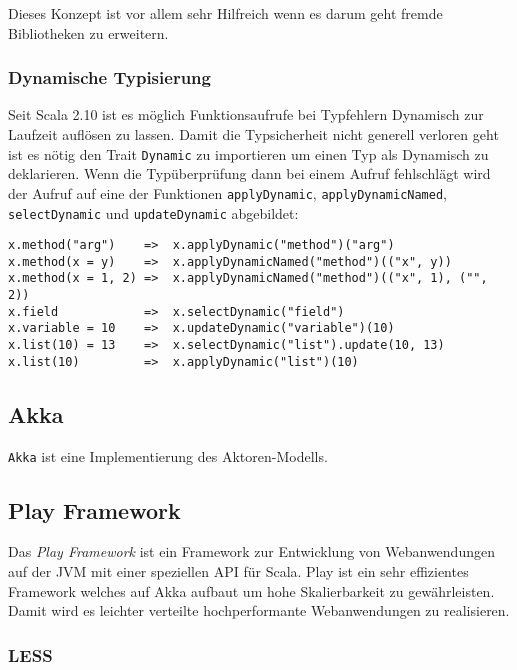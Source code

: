 Dieses Konzept ist vor allem sehr Hilfreich wenn es darum geht fremde 
Bibliotheken zu erweitern.

\subsubsection{Dynamische Typisierung}

Seit Scala 2.10 ist es möglich Funktionsaufrufe bei Typfehlern Dynamisch zur 
Laufzeit auflösen zu lassen. Damit die Typsicherheit nicht generell verloren 
geht ist es nötig den Trait \texttt{Dynamic} zu importieren um einen Typ als 
Dynamisch zu deklarieren. Wenn die Typüberprüfung dann bei einem Aufruf 
fehlschlägt wird der Aufruf auf eine der Funktionen \texttt{applyDynamic}, 
\texttt{applyDynamicNamed}, \texttt{selectDynamic} und \texttt{updateDynamic} 
abgebildet:

\begin{lstlisting}
x.method("arg")    =>  x.applyDynamic("method")("arg")
x.method(x = y)    =>  x.applyDynamicNamed("method")(("x", y))
x.method(x = 1, 2) =>  x.applyDynamicNamed("method")(("x", 1), ("", 2))
x.field            =>  x.selectDynamic("field")
x.variable = 10    =>  x.updateDynamic("variable")(10)
x.list(10) = 13    =>  x.selectDynamic("list").update(10, 13)
x.list(10)         =>  x.applyDynamic("list")(10)
\end{lstlisting}
 
\subsection{Akka}

\cite{actors}

\texttt{Akka} ist eine Implementierung des Aktoren-Modells.

\subsection{Play Framework}

Das \textit{Play Framework} ist ein Framework zur Entwicklung von Webanwendungen 
auf der JVM mit einer speziellen API für Scala. Play ist ein sehr effizientes 
Framework welches auf Akka aufbaut um hohe Skalierbarkeit zu gewährleisten. 
Damit wird es leichter verteilte hochperformante Webanwendungen zu realisieren.

\subsubsection{LESS}

